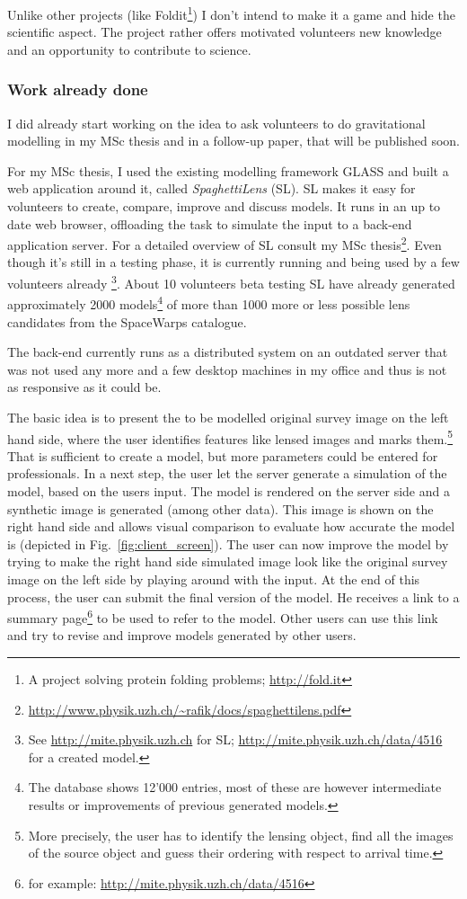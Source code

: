 \documentclass[11pt]{article}
\begin{document}
Unlike other projects (like Foldit\footnote{A project solving protein folding problems; \url{http://fold.it}}) I don't intend to make it a game and hide the scientific aspect.
The project rather offers motivated volunteers new knowledge and an opportunity to contribute to science.


\subsubsection{Work already done}

I did already start working on the idea to ask volunteers to do gravitational modelling in my MSc thesis and in a follow-up paper, that will be published soon.

For my MSc thesis\cite{mscth}, I used the existing modelling framework GLASS\cite{glass2, glass} and built a web application around it, called \emph{SpaghettiLens} (SL).
SL makes it easy for volunteers to create, compare, improve and discuss models.
It runs in an up to date web browser, offloading the task to simulate the input to a back-end application server.
For a detailed overview of SL consult my MSc thesis\footnote{\url{http://www.physik.uzh.ch/~rafik/docs/spaghettilens.pdf}}.
Even though it's still in a testing phase, it is currently running and being used by a few volunteers already
\footnote{See \url{http://mite.physik.uzh.ch} for SL; \url{http://mite.physik.uzh.ch/data/4516} for a created model.}.
About 10 volunteers beta testing SL have already generated approximately 2000 models\footnote{The database shows 12'000 entries, most of these are however intermediate results or improvements of previous generated models.} of more than 1000 more or less possible lens candidates from the SpaceWarps catalogue.

The back-end currently runs as a distributed system on an outdated server that was not used any more and a few desktop machines in my office and thus is not as responsive as it could be.

The basic idea is to present the to be modelled original survey image on the left hand side, where the user identifies features like lensed images and marks them.\footnote{More precisely, the user has to identify the lensing object, find all the images of the source object and guess their ordering with respect to arrival time.}
That is sufficient to create a model, but more parameters could be entered for professionals.
In a next step, the user let the server generate a simulation of the model, based on the users input.
The model is rendered on the server side and a synthetic image is generated (among other data).
This image is shown on the right hand side and allows visual comparison to evaluate how accurate the model is (depicted in Fig.~\ref{fig:client_screen}).
The user can now improve the model by trying to make the right hand side simulated image look like the original survey image on the left side by playing around with the input.
At the end of this process, the user can submit the final version of the model.
He receives a link to a summary page\footnote{for example: \url{http://mite.physik.uzh.ch/data/4516}} to be used to refer to the model.
Other users can use this link and try to revise and improve models generated by other users.
\end{document}
